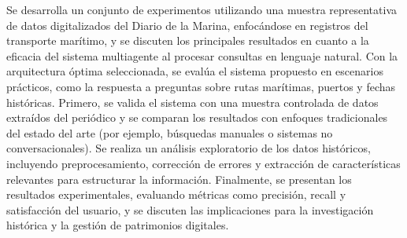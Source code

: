 \begin{itemize}
	Se desarrolla un conjunto de experimentos utilizando una muestra representativa de datos digitalizados del Diario de la Marina, enfocándose en registros del transporte marítimo, y se discuten los principales resultados en cuanto a la eficacia del sistema multiagente al procesar consultas en lenguaje natural. Con la arquitectura óptima seleccionada, se evalúa el sistema propuesto en escenarios prácticos, como la respuesta a preguntas sobre rutas marítimas, puertos y fechas históricas. Primero, se valida el sistema con una muestra controlada de datos extraídos del periódico y se comparan los resultados con enfoques tradicionales del estado del arte (por ejemplo, búsquedas manuales o sistemas no conversacionales). Se realiza un análisis exploratorio de los datos históricos, incluyendo preprocesamiento, corrección de errores y extracción de características relevantes para estructurar la información. Finalmente, se presentan los resultados experimentales, evaluando métricas como precisión, recall y satisfacción del usuario, y se discuten las implicaciones para la investigación histórica y la gestión de patrimonios digitales.
\end{itemize}


	











